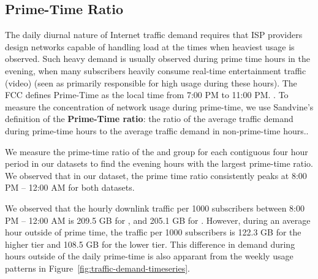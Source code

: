 \subsection{Prime-Time Ratio} \label{subsec:primetime}

The daily diurnal nature of Internet traffic demand requires that ISP providers 
design networks capable of handling load at the times when heaviest usage is 
observed. Such heavy demand is usually observed during prime time hours in the 
evening, when many subscribers heavily consume real-time entertainment traffic
(video) (seen as primarily responsible for high usage during these hours). The FCC defines 
Prime-Time as the local time from 7:00 PM to 11:00 PM.
\cite{fcc2014measuring-broadband}. To measure the concentration of network usage
during prime-time, we use Sandvine's definition of the \textbf{Prime-Time 
ratio}: the ratio of the average traffic demand during prime-time hours to the average 
traffic demand in non-prime-time hours.\cite{sandvine20141h, sandvine20142h}.

We measure the prime-time ratio of the \control{} and \treatment{} group
for each contiguous four hour period in our datasets to find the evening hours with
the largest prime-time ratio. We observed that in our dataset,
the prime time ratio consistently peaks at 8:00 PM -- 12:00 AM for both
datasets.





We observed that the hourly downlink traffic per 1000 subscribers between 8:00 PM -- 12:00 AM is 
209.5 GB for \treatment{}, and 205.1 GB for \control{}. However, during an average hour
outside of prime time, the traffic per 1000 subscribers is 122.3 GB for the higher tier
and 108.5 GB for the lower tier. This difference in demand during hours outside of the
daily prime-time is also apparant from the weekly usage patterns in Figure~\ref{fig:traffic-demand-timeseries}.

